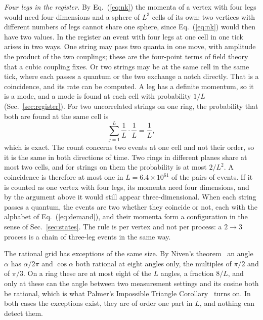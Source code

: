 \documentclass[aps,prd,twocolumn,superscriptaddress,nofootinbib]{revtex4-2}
\begin{document}
\textit{Four legs in the register.} By Eq.~(\ref{eq:nk}) the momenta of a vertex with four legs would need four dimensions and a sphere of $L^3$ cells of its own; two vertices with different numbers of legs cannot share one sphere, since Eq.~(\ref{eq:nk}) would then have two values. In the register an event with four legs at one cell in one tick arises in two ways. One string may pass two quanta in one move, with amplitude the product of the two couplings; these are the four-point terms of field theory that a cubic coupling fixes. Or two strings may be at the same cell in the same tick, where each passes a quantum or the two exchange a notch directly. That is a coincidence, and its rate can be computed. A leg has a definite momentum, so it is a mode, and a mode is found at each cell with probability $1/L$ (Sec.~\ref{sec:register}). For two uncorrelated strings on one ring, the probability that both are found at the same cell is
\begin{equation}
\sum_{j=1}^{L}\frac{1}{L}\cdot\frac{1}{L} = \frac{1}{L} ,
\label{eq:coincidence}
\end{equation}
which is exact. The count concerns two events at one cell and not their order, so it is the same in both directions of time. Two rings in different planes share at most two cells, and for strings on them the probability is at most $2/L^2$. A coincidence is therefore at most one in $L = 6.4\times10^{61}$ of the pairs of events. If it is counted as one vertex with four legs, its momenta need four dimensions, and by the argument above it would still appear three-dimensional. When each string passes a quantum, the events are two whether they coincide or not, each with the alphabet of Eq.~(\ref{eq:demand}), and their momenta form a configuration in the sense of Sec.~\ref{sec:states}. The rule is per vertex and not per process: a $2\to3$ process is a chain of three-leg events in the same way.

The rational grid has exceptions of the same size. By Niven's theorem~\cite{niven1956,jahnel2010} an angle $\alpha$ has $\alpha/2\pi$ and $\cos\alpha$ both rational at eight angles only, the multiples of $\pi/2$ and of $\pi/3$. On a ring these are at most eight of the $L$ angles, a fraction $8/L$, and only at these can the angle between two measurement settings and its cosine both be rational, which is what Palmer's Impossible Triangle Corollary~\cite{palmer2026b,palmer2026c} turns on. In both cases the exceptions exist, they are of order one part in $L$, and nothing can detect them.
\end{document}
